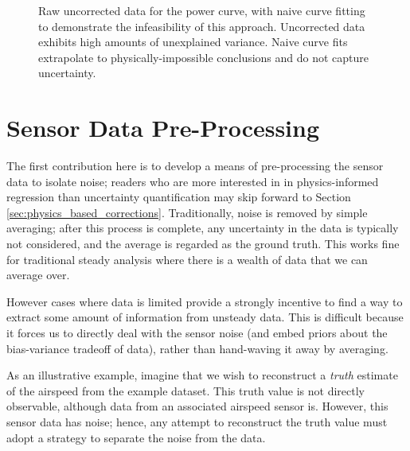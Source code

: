 \documentclass[conf]{new-aiaa}
\begin{document}
    \begin{figure}[H]
        \centering
        \caption{Raw uncorrected data for the power curve, with naive curve fitting to demonstrate the infeasibility of this approach. Uncorrected data exhibits high amounts of unexplained variance. Naive curve fits extrapolate to physically-impossible conclusions and do not capture uncertainty.}
        \label{fig:power_curve_naive}
    \end{figure}


    \section{Sensor Data Pre-Processing}

    The first contribution here is to develop a means of pre-processing the sensor data to isolate noise; readers who are more interested in in physics-informed regression than uncertainty quantification may skip forward to Section \ref{sec:physics_based_corrections}. Traditionally, noise is removed by simple averaging; after this process is complete, any uncertainty in the data is typically not considered, and the average is regarded as the ground truth. This works fine for traditional steady analysis where there is a wealth of data that we can average over.

    However cases where data is limited provide a strongly incentive to find a way to extract some amount of information from unsteady data. This is difficult because it forces us to directly deal with the sensor noise (and embed priors about the bias-variance tradeoff of data), rather than hand-waving it away by averaging.

    As an illustrative example, imagine that we wish to reconstruct a \emph{truth} estimate of the airspeed from the example dataset. This truth value is not directly observable, although data from an associated airspeed sensor is. However, this sensor data has noise; hence, any attempt to reconstruct the truth value must adopt a strategy to separate the noise from the data.
\end{document}
